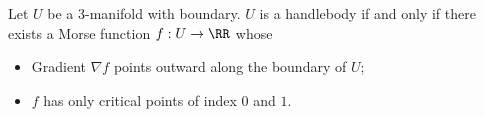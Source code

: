 

    Let $U$ be a 3-manifold with boundary. $U$ is a handlebody if and only if there exists a Morse function $f: U\to \RR$ whose 
    \begin{itemize}
        \item Gradient $\nabla f$ points outward along the boundary of $U$;
        \item $f$ has only critical points of index $0$ and $1$.
    \end{itemize}
    \label{lem:handlebodies}
